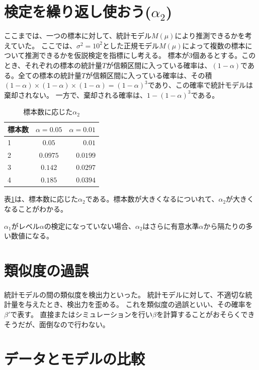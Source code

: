 \section{検定を繰り返し使おう($\alpha_2$)}
ここまでは、一つの標本に対して、統計モデル$M(\mu)$により推測できるかを考えていた。
ここでは、$\sigma^2=10^2$とした正規モデル$M(\mu)$によって複数の標本について推測できるかを仮説検定を指標にし考える。
標本が$3$個あるとする。このとき、それぞれの標本の統計量$T$が信頼区間に入っている確率は、$(1-\alpha)$である。全ての標本の統計量$T$が信頼区間に入っている確率は、その積$(1-\alpha)\times(1-\alpha)\times(1-\alpha)=(1-\alpha)^3$であり、この確率で統計モデルは棄却されない。
一方で、棄却される確率は、$1-(1-\alpha)^3$である。
\begin{table}[hbtp]
    \caption{標本数に応じた$\alpha_2$}
    \label{table:multiple_test_reject_prob}
    \centering
    \begin{tabular}{lcr}
      \hline
      標本数  & $\alpha=0.05$  &  $\alpha=0.01$ \\
      \hline \hline
       1 & $0.05$  & $0.01$ \\
       2 & $0.0975$ & $0.0199$\\
       3 & $0.142$ & $0.0297$\\
       4 & $0.185$ & $0.0394$\\
    \end{tabular}
  \end{table}
表\ref{table:multiple_test_reject_prob}は、標本数に応じた$\alpha_2$である。標本数が大きくなるについれて、$\alpha_2$が大きくなることがわかる。

$\alpha_1$がレベル$\alpha$の検定になっていない場合、$\alpha_2$はさらに有意水準$\alpha$から隔たりの多い数値になる。




\section{類似度の過誤}
統計モデルの間の類似度を検出力といった。
統計モデルに対して、不適切な統計量を与えたとき、検出力を歪める。
これを類似度の過誤といい、その確率を$\beta'$で表す。
直接またはシミュレーションを行い$\beta$を計算することがおそらくできそうだが、面倒なので行わない。




\section{データとモデルの比較}

